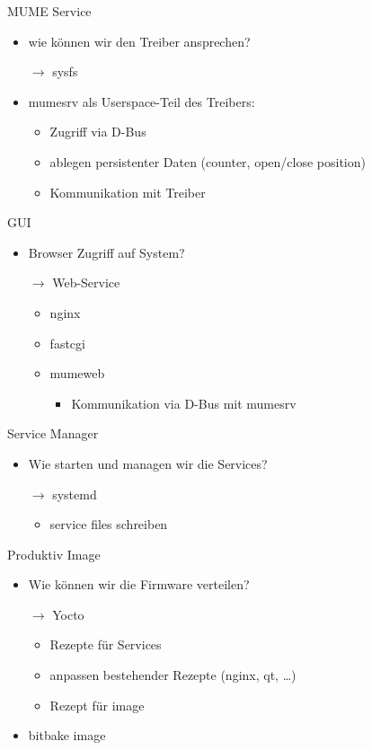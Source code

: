 \begin{frame}{MUME Service}
	\begin{itemize}
		\item wie können wir den Treiber ansprechen?
		\item[$\rightarrow$] sysfs
		\item mumesrv als Userspace-Teil des Treibers:
		\begin{itemize}
			\item Zugriff via D-Bus
			\item ablegen persistenter Daten (counter, open/close position)
			\item Kommunikation mit Treiber
		\end{itemize}
	\end{itemize}
\end{frame}

\begin{frame}{GUI}
	\begin{itemize}
		\item Browser Zugriff auf System?
		\item[$\rightarrow$] Web-Service
		\begin{itemize}
			\item nginx
			\item fastcgi
			\item mumeweb
			\begin{itemize}
				\item Kommunikation via D-Bus mit mumesrv
			\end{itemize}
		\end{itemize}
	\end{itemize}
\end{frame}

\begin{frame}{Service Manager}
	\begin{itemize}
		\item Wie starten und managen wir die Services?
		\item[$\rightarrow$] systemd
		\begin{itemize}
			\item service files schreiben
		\end{itemize}
	\end{itemize}
\end{frame}

\begin{frame}{Produktiv Image}
	\begin{itemize}
		\item Wie können wir die Firmware verteilen?
		\item[$\rightarrow$] Yocto
		\begin{itemize}
			\item Rezepte für Services
			\item anpassen bestehender Rezepte (nginx, qt, \ldots)
			\item Rezept für image
		\end{itemize}
		\item bitbake image
	\end{itemize}
\end{frame}

